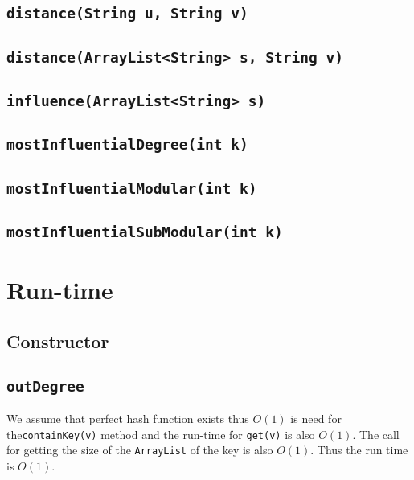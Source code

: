\documentclass[10pt,letterpaper]{article}
\begin{document}
\subsection{\texttt{distance(String u, String v)}}
\subsection{\texttt{distance(ArrayList<String> s, String v)}}
\subsection{\texttt{influence(ArrayList<String> s)}}
\subsection{\texttt{mostInfluentialDegree(int k)}}
\subsection{\texttt{mostInfluentialModular(int k)}}
\subsection{\texttt{mostInfluentialSubModular(int k)}}
\section{Run-time}
\subsection{Constructor}
\subsection{\texttt{outDegree}}
We assume that perfect hash function exists thus $O(1)$ is need for the\texttt{containKey(v)} method and the run-time for \texttt{get(v)} is also $O(1)$. The call for getting the size of the \texttt{ArrayList} of the key is also $O(1)$.
Thus the run time is $O(1)$.
\end{document}
